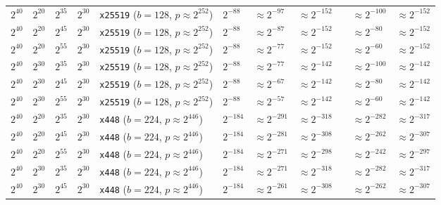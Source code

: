 \begin{table}[p]
\begin{tabular}{@{}lllllllllll@{}}
\midrule
$2^{40}$	&$2^{20}$	&$2^{35}$	&$2^{30}$	&\texttt{x25519} ($b \!=\! 128$,\! $p \!\approx\! 2^{252}$)	&$2^{-88}$	&$\approx 2^{-97}$	& $\approx 2^{-152}$	&& $\approx 2^{-100}$	& $\approx 2^{-152}$	 \\
$2^{40}$	&$2^{20}$	&$2^{45}$	&$2^{30}$	&\texttt{x25519} ($b \!=\! 128$,\! $p \!\approx\! 2^{252}$)	&$2^{-88}$	&\cellcolor{red!25}$\approx 2^{-87}$	&$\approx 2^{-152}$	&& \cellcolor{red!25}$\approx 2^{-80}$	&$\approx 2^{-152}$	 \\
$2^{40}$	&$2^{20}$	&$2^{55}$	&$2^{30}$	&\texttt{x25519} ($b \!=\! 128$,\! $p \!\approx\! 2^{252}$)	&$2^{-88}$	&\cellcolor{red!25}$\approx 2^{-77}$	&$\approx 2^{-152}$	&& \cellcolor{red!25}$\approx 2^{-60}$	&$\approx 2^{-152}$	 \\
$2^{40}$	&$2^{30}$	&$2^{35}$	&$2^{30}$	&\texttt{x25519} ($b \!=\! 128$,\! $p \!\approx\! 2^{252}$)	&$2^{-88}$	&\cellcolor{red!25}$\approx 2^{-77}$	&$\approx 2^{-142}$	&& $\approx 2^{-100}$	& $\approx 2^{-142}$	 \\
$2^{40}$	&$2^{30}$	&$2^{45}$	&$2^{30}$	&\texttt{x25519} ($b \!=\! 128$,\! $p \!\approx\! 2^{252}$)	&$2^{-88}$	&\cellcolor{red!25}$\approx 2^{-67}$	&$\approx 2^{-142}$	&& \cellcolor{red!25}$\approx 2^{-80}$	&$\approx 2^{-142}$	 \\
$2^{40}$	&$2^{30}$	&$2^{55}$	&$2^{30}$	&\texttt{x25519} ($b \!=\! 128$,\! $p \!\approx\! 2^{252}$)	&$2^{-88}$	&\cellcolor{red!25}$\approx 2^{-57}$	&$\approx 2^{-142}$	&& \cellcolor{red!25}$\approx 2^{-60}$	&$\approx 2^{-142}$	 \\
\midrule
$2^{40}$	&$2^{20}$	&$2^{35}$	&$2^{30}$	&\texttt{x448} ($b \!=\! 224$,\! $p \!\approx\! 2^{446}$)	&$2^{-184}$	&$\approx 2^{-291}$	& $\approx 2^{-318}$	&& $\approx 2^{-282}$	& $\approx 2^{-317}$	 \\
$2^{40}$	&$2^{20}$	&$2^{45}$	&$2^{30}$	&\texttt{x448} ($b \!=\! 224$,\! $p \!\approx\! 2^{446}$)	&$2^{-184}$	&$\approx 2^{-281}$	& $\approx 2^{-308}$	&& $\approx 2^{-262}$	& $\approx 2^{-307}$	 \\
$2^{40}$	&$2^{20}$	&$2^{55}$	&$2^{30}$	&\texttt{x448} ($b \!=\! 224$,\! $p \!\approx\! 2^{446}$)	&$2^{-184}$	&$\approx 2^{-271}$	& $\approx 2^{-298}$	&& $\approx 2^{-242}$	& $\approx 2^{-297}$	 \\
$2^{40}$	&$2^{30}$	&$2^{35}$	&$2^{30}$	&\texttt{x448} ($b \!=\! 224$,\! $p \!\approx\! 2^{446}$)	&$2^{-184}$	&$\approx 2^{-271}$	& $\approx 2^{-318}$	&& $\approx 2^{-282}$	& $\approx 2^{-317}$	 \\
$2^{40}$	&$2^{30}$	&$2^{45}$	&$2^{30}$	&\texttt{x448} ($b \!=\! 224$,\! $p \!\approx\! 2^{446}$)	&$2^{-184}$	&$\approx 2^{-261}$	& $\approx 2^{-308}$	&& $\approx 2^{-262}$	& $\approx 2^{-307}$	 \\

\end{tabular}
\end{table}
